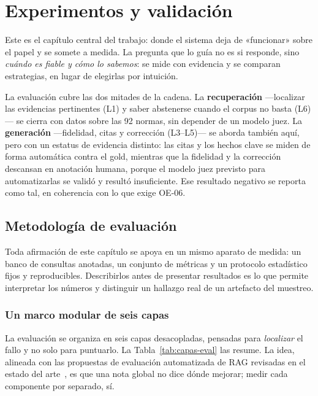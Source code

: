 \chapter{Experimentos y validación}
\label{chap:experimentos}

Este es el capítulo central del trabajo: donde el sistema deja de «funcionar» sobre el papel y se somete a medida. La pregunta que lo guía no es si responde, sino \emph{cuándo es fiable y cómo lo sabemos}: se mide con evidencia y se comparan estrategias, en lugar de elegirlas por intuición.

La evaluación cubre las dos mitades de la cadena. La \textbf{recuperación} —localizar las evidencias pertinentes (L1) y saber abstenerse cuando el corpus no basta (L6)— se cierra con datos sobre las 92 normas, sin depender de un modelo juez. La \textbf{generación} —fidelidad, citas y corrección (L3--L5)— se aborda también aquí, pero con un estatus de evidencia distinto: las citas y los hechos clave se miden de forma automática contra el gold, mientras que la fidelidad y la corrección descansan en anotación humana, porque el modelo juez previsto para automatizarlas se validó y resultó insuficiente. Ese resultado negativo se reporta como tal, en coherencia con lo que exige OE-06.

\section{Metodología de evaluación}
\label{sec:metodologia-eval}

Toda afirmación de este capítulo se apoya en un mismo aparato de medida: un banco de consultas anotadas, un conjunto de métricas y un protocolo estadístico fijos y reproducibles. Describirlos antes de presentar resultados es lo que permite interpretar los números y distinguir un hallazgo real de un artefacto del muestreo.

\subsection{Un marco modular de seis capas}
\label{subsec:marco-capas}

La evaluación se organiza en seis capas desacopladas, pensadas para \emph{localizar} el fallo y no solo para puntuarlo. La Tabla~\ref{tab:capas-eval} las resume. La idea, alineada con las propuestas de evaluación automatizada de RAG revisadas en el estado del arte~\cite{es2024ragas,saadfalcon2024ares}, es que una nota global no dice dónde mejorar; medir cada componente por separado, sí.

